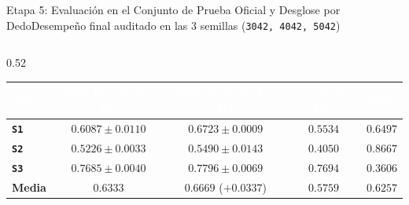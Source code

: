 \begin{frame}{Etapa 5: Evaluaci\'on en el Conjunto de Prueba Oficial y Desglose por Dedo}{Desempe\~no final auditado en las 3 semillas (\texttt{3042, 4042, 5042}) \cite{lin1989concordance,rodas_valencia_tpe_ecog}}
  \begin{columns}[T,onlytextwidth]
    \begin{column}{0.52\textwidth}
      \scriptsize
      \centering
      \renewcommand{\arraystretch}{1.16}
      \setlength{\tabcolsep}{3.5pt}
      \begin{tabular}{@{} l c c c c @{}}
        \toprule
        \rowcolor{ipnDark}
        \textcolor{white}{\textbf{Sujeto}} &
        \textcolor{white}{\textbf{Test Inicial (\texttt{B1--B4})}} &
        \textcolor{white}{\textbf{Pearson Test (\texttt{B1--B5})}} &
        \textcolor{white}{\textbf{CCC de Lin}} &
        \textcolor{white}{\textbf{MSE}} \\
        \midrule
        \textbf{\texttt{S1}} & $0.6087 \pm 0.0110$ & $\mathbf{0.6723 \pm 0.0009}$ & $0.5534$ & $0.6497$ \\
        \rowcolor{rowLight}
        \textbf{\texttt{S2}} & $0.5226 \pm 0.0033$ & $\mathbf{0.5490 \pm 0.0143}$ & $0.4050$ & $0.8667$ \\
        \textbf{\texttt{S3}} & $0.7685 \pm 0.0040$ & $\mathbf{0.7796 \pm 0.0069}$ & $0.7694$ & $0.3606$ \\
        \midrule
        \rowcolor{rowHighlight}
        \textbf{Media} & $\mathbf{0.6333}$ & $\mathbf{0.6669}$ ($\mathbf{+0.0337}$) & $\mathbf{0.5759}$ & $\mathbf{0.6257}$ \\
        \bottomrule
      \end{tabular}


\end{column}
\end{columns}
\end{frame}
